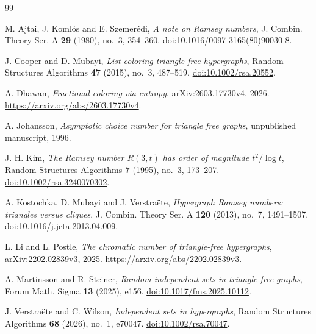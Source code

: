 \documentclass[11pt]{article}
\numberwithin{equation}{section}
\theoremstyle{remark}
\begin{document}
\begin{thebibliography}{99}

M. Ajtai, J. Koml\'os and E. Szemer\'edi,
\emph{A note on Ramsey numbers},
J. Combin. Theory Ser. A \textbf{29} (1980), no.~3, 354--360.
\href{https://doi.org/10.1016/0097-3165(80)90030-8}{doi:10.1016/0097-3165(80)90030-8}.

J. Cooper and D. Mubayi,
\emph{List coloring triangle-free hypergraphs},
Random Structures Algorithms \textbf{47} (2015), no.~3, 487--519.
\href{https://doi.org/10.1002/rsa.20552}{doi:10.1002/rsa.20552}.

A. Dhawan,
\emph{Fractional coloring via entropy},
arXiv:2603.17730v4, 2026.
\url{https://arxiv.org/abs/2603.17730v4}.

A. Johansson,
\emph{Asymptotic choice number for triangle free graphs},
unpublished manuscript, 1996.

J. H. Kim,
\emph{The Ramsey number $R(3,t)$ has order of magnitude $t^2/\log t$},
Random Structures Algorithms \textbf{7} (1995), no.~3, 173--207.
\href{https://doi.org/10.1002/rsa.3240070302}{doi:10.1002/rsa.3240070302}.

A. Kostochka, D. Mubayi and J. Verstra\"ete,
\emph{Hypergraph Ramsey numbers: triangles versus cliques},
J. Combin. Theory Ser. A \textbf{120} (2013), no.~7, 1491--1507.
\href{https://doi.org/10.1016/j.jcta.2013.04.009}{doi:10.1016/j.jcta.2013.04.009}.

L. Li and L. Postle,
\emph{The chromatic number of triangle-free hypergraphs},
arXiv:2202.02839v3, 2025.
\url{https://arxiv.org/abs/2202.02839v3}.

A. Martinsson and R. Steiner,
\emph{Random independent sets in triangle-free graphs},
Forum Math. Sigma \textbf{13} (2025), e156.
\href{https://doi.org/10.1017/fms.2025.10112}{doi:10.1017/fms.2025.10112}.

J. Verstra\"ete and C. Wilson,
\emph{Independent sets in hypergraphs},
Random Structures Algorithms \textbf{68} (2026), no.~1, e70047.
\href{https://doi.org/10.1002/rsa.70047}{doi:10.1002/rsa.70047}.

\end{thebibliography}
\end{document}
